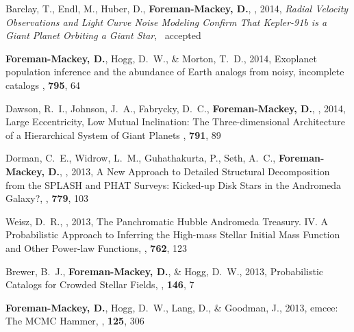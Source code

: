 \item Barclay, T., Endl, M.,  Huber, D., {\bf Foreman-Mackey, D.}, \etal, 2014,
    \emph{Radial Velocity Observations and Light Curve Noise Modeling Confirm
          That Kepler-91b is a Giant Planet Orbiting a Giant Star},
    \apj\ accepted 

\item {\bf Foreman-Mackey, D.}, Hogg, D.~W., \& Morton, T.~D., 2014,
        {Exoplanet population inference and the abundance of Earth analogs
         from noisy, incomplete catalogs}
    \apj, \textbf{795}, 64

\item Dawson, R.~I., Johnson,  J.~A., Fabrycky, D.~C.,
    {\bf Foreman-Mackey, D.}, \etal, 2014,
        {Large Eccentricity, Low Mutual Inclination: The Three-dimensional
         Architecture of a Hierarchical System of Giant Planets}
    \apj, \textbf{791}, 89

\item Dorman, C.~E., Widrow, L.~M., Guhathakurta, P., Seth, A.~C.,
    {\bf Foreman-Mackey, D.}, \etal, 2013,
        {A New Approach to Detailed Structural Decomposition from the SPLASH
         and PHAT Surveys: Kicked-up Disk Stars in the Andromeda Galaxy?},
    \apj, \textbf{779}, 103

\item Weisz, D.~R., \etal, 2013,
        {The Panchromatic Hubble Andromeda Treasury. IV. A Probabilistic
         Approach to Inferring the High-mass Stellar Initial Mass Function and
         Other Power-law Functions},
    \apj, \textbf{762}, 123

\item Brewer, B.~J., {\bf Foreman-Mackey, D.}, \& Hogg, D.~W., 2013,
        {Probabilistic Catalogs for Crowded Stellar Fields},
    \aj, \textbf{146}, 7

\item {\bf Foreman-Mackey, D.}, Hogg, D.~W., Lang, D., \& Goodman, J., 2013,
        {emcee: The MCMC Hammer},
    \pasp, \textbf{125}, 306
